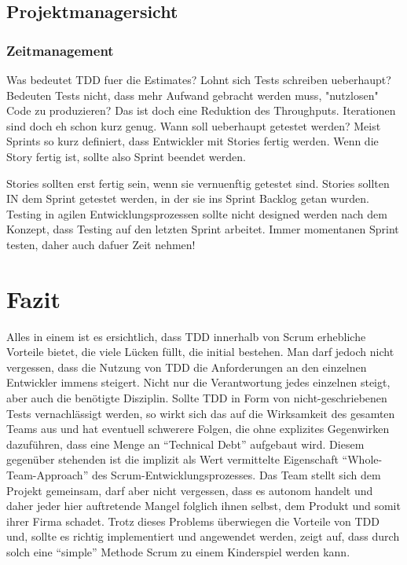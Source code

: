 \documentclass[12pt,DIV14,BCOR10mm,a4paper,twoside,parskip=half-,headsepline,headinclude,english,ngerman,bibliography=totocnumbered]{scrreprt}
\begin{document}
\section{Projektmanagersicht}
\subsection{Zeitmanagement}

Was bedeutet TDD fuer die Estimates?
Lohnt sich Tests schreiben ueberhaupt?
Bedeuten Tests nicht, dass mehr Aufwand gebracht werden muss, "nutzlosen" Code zu produzieren?
Das ist doch eine Reduktion des Throughputs.
Iterationen sind doch eh schon kurz genug.
Wann soll ueberhaupt getestet werden?
Meist Sprints so kurz definiert, dass Entwickler mit Stories fertig werden.
Wenn die Story fertig ist, sollte also Sprint beendet werden.

Stories sollten erst fertig sein, wenn sie vernuenftig getestet sind.
Stories sollten IN dem Sprint getestet werden, in der sie ins Sprint Backlog getan wurden.
Testing in agilen Entwicklungsprozessen sollte nicht designed werden nach dem Konzept, dass Testing auf den letzten Sprint arbeitet.
Immer momentanen Sprint testen, daher auch dafuer Zeit nehmen!

\chapter{Fazit}

Alles in einem ist es ersichtlich, dass TDD innerhalb von Scrum erhebliche Vorteile bietet, die viele Lücken füllt, die initial bestehen.
Man darf jedoch nicht vergessen, dass die Nutzung von TDD die Anforderungen an den einzelnen Entwickler immens steigert.
Nicht nur die Verantwortung jedes einzelnen steigt, aber auch die benötigte Disziplin.
Sollte TDD in Form von nicht-geschriebenen Tests vernachlässigt werden, so wirkt sich das auf die Wirksamkeit des gesamten Teams aus und hat eventuell schwerere Folgen, die ohne explizites Gegenwirken dazuführen, dass eine Menge an \enquote{Technical Debt} aufgebaut wird.
Diesem gegenüber stehenden ist die implizit als Wert vermittelte Eigenschaft \enquote{Whole-Team-Approach} des Scrum-Entwicklungsprozesses.
Das Team stellt sich dem Projekt gemeinsam, darf aber nicht vergessen, dass es autonom handelt und daher jeder hier auftretende Mangel folglich ihnen selbst, dem Produkt und somit ihrer Firma schadet.
Trotz dieses Problems überwiegen die Vorteile von TDD und, sollte es richtig implementiert und angewendet werden, zeigt auf, dass durch solch eine \enquote{simple} Methode Scrum zu einem Kinderspiel werden kann.
\end{document}
